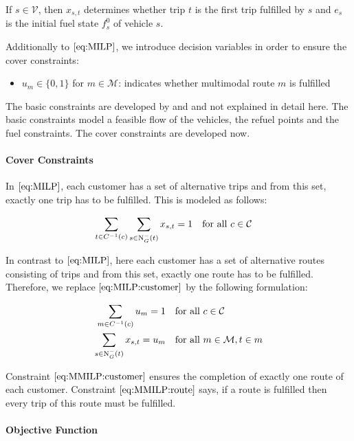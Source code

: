 If $s\in\mathcal{V}$, then $x_{s,t}$ determines whether trip $t$ is the first trip fulfilled by $s$ and $e_s$ is the initial fuel state $f^0_s$ of vehicle $s$.

Additionally to $\eqref{eq:MILP}$, we introduce decision variables in order to ensure the cover constraints:

\begin{itemize}
	\item{$u_m\in\{0,1\}$ for $m\in\mathcal{M}$: indicates whether multimodal route $m$ is fulfilled}
\end{itemize}

The basic constraints are developed by \cite{Kaiser} and \cite{Knoll} and not explained in detail here. The basic constraints model a feasible flow of the vehicles, the refuel points and the fuel constraints. The cover constraints are developed now.

\paragraph{Cover Constraints} \parfill

In $\eqref{eq:MILP}$, each customer has a set of alternative trips and from this set, exactly one trip has to be fulfilled. This is modeled as follows:

\begin{align}
	\sum_{t\in C^{-1}(c)} \sum_{s\in\operatorname{N}_G^-(t)} x_{s,t} = 1 &&& \text{for all } c\in\mathcal{C} \label{eq:MILP:customer}
\end{align}

In contrast to $\eqref{eq:MILP}$, here each customer has a set of alternative routes consisting of trips and from this set, exactly one route has to be fulfilled. Therefore, we replace $\eqref{eq:MILP:customer}$ by the following formulation:

\begin{align}
	\sum_{m\in C^{-1}(c)} u_m = 1 &&& \text{for all } c\in\mathcal{C} \label{eq:MMILP:customer} \\
	\sum_{s\in\operatorname{N}_G^-(t)} x_{s,t} = u_m &&& \text{for all } m\in\mathcal{M}, t\in m \label{eq:MMILP:route}
\end{align}

Constraint $\eqref{eq:MMILP:customer}$ ensures the completion of exactly one route of each customer. Constraint $\eqref{eq:MMILP:route}$ says, if a route is fulfilled then every trip of this route must be fulfilled.

\paragraph{Objective Function} \parfill

